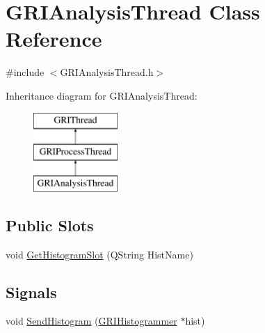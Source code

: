 \hypertarget{classGRIAnalysisThread}{\section{\-G\-R\-I\-Analysis\-Thread \-Class \-Reference}
\label{classGRIAnalysisThread}
}


{\ttfamily \#include $<$\-G\-R\-I\-Analysis\-Thread.\-h$>$}

\-Inheritance diagram for \-G\-R\-I\-Analysis\-Thread\-:\begin{figure}[H]
\begin{center}
\leavevmode
\includegraphics[height=3.000000cm]{classGRIAnalysisThread}
\end{center}
\end{figure}
\subsection*{\-Public \-Slots}
\begin{DoxyCompactItemize}
\item 
void \hyperlink{classGRIAnalysisThread_af6103bed49e7727f662636520cd50ce7}{\-Get\-Histogram\-Slot} (\-Q\-String \-Hist\-Name)
\end{DoxyCompactItemize}
\subsection*{\-Signals}
\begin{DoxyCompactItemize}
\item 
void \hyperlink{classGRIAnalysisThread_a103c0d1a1dba9090fce8c357c63aa067}{\-Send\-Histogram} (\hyperlink{classGRIHistogrammer}{\-G\-R\-I\-Histogrammer} $\ast$hist)
\end{DoxyCompactItemize}
